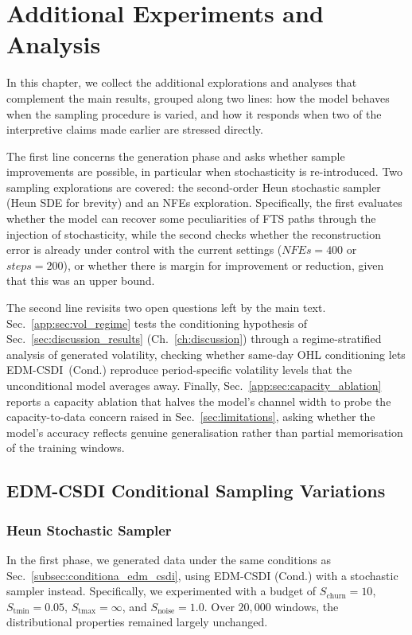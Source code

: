 \chapter{Additional Experiments and Analysis}
\label{app:ch:additional_experiments}
In this chapter, we collect the additional explorations and analyses that complement the main results, grouped along two lines: how the model behaves when the sampling procedure is varied, and how it responds when two of the interpretive claims made earlier are stressed directly.

The first line concerns the generation phase and asks whether sample improvements are possible, in particular when stochasticity is re-introduced. Two sampling explorations are covered: the second-order Heun stochastic sampler (Heun SDE for brevity) and an NFEs exploration. Specifically, the first evaluates whether the model can recover some peculiarities of FTS paths through the injection of stochasticity, while the second checks whether the reconstruction error is already under control with the current settings (\(NFEs=400\) or \(steps=200\)), or whether there is margin for improvement or reduction, given that this was an upper bound.

The second line revisits two open questions left by the main text. Sec.~\ref{app:sec:vol_regime} tests the conditioning hypothesis of Sec.~\ref{sec:discussion_results} (Ch.~\ref{ch:discussion}) through a regime-stratified analysis of generated volatility, checking whether same-day OHL conditioning lets EDM-CSDI~(Cond.) reproduce period-specific volatility levels that the unconditional model averages away. Finally, Sec.~\ref{app:sec:capacity_ablation} reports a capacity ablation that halves the model's channel width to probe the capacity-to-data concern raised in Sec.~\ref{sec:limitations}, asking whether the model's accuracy reflects genuine generalisation rather than partial memorisation of the training windows.
\section{EDM-CSDI Conditional Sampling Variations}
\subsection{Heun Stochastic Sampler}
In the first phase, we generated data under the same conditions as Sec.\ \ref{subsec:conditiona_edm_csdi}, using EDM-CSDI (Cond.) with a stochastic sampler instead. Specifically, we experimented with a budget of \(S_{\text{churn}}=10\), \(S_{\text{tmin}}=0.05\), \(S_{\text{tmax}}=\infty\), and \(S_{\text{noise}}=1.0\). Over \(20,000\) windows, the distributional properties remained largely unchanged.

